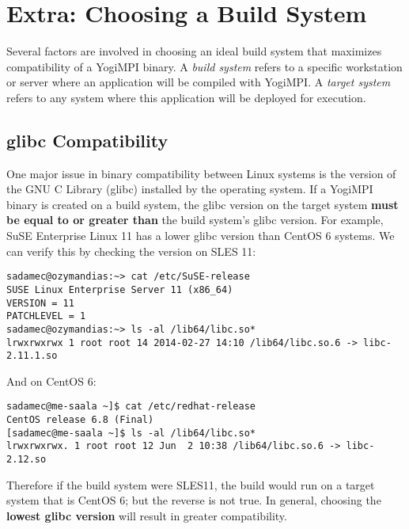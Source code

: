 \documentclass{article}
\begin{document}
\section{Extra: Choosing a Build System}
\label{choosebuild}
Several factors are involved in choosing an ideal build system that maximizes compatibility of a YogiMPI binary. A \textit{build system} refers to a specific workstation or server where an application will be compiled with YogiMPI.  A \textit{target system} refers to any system where this application will be deployed for execution.
\subsection{glibc Compatibility}
One major issue in binary compatibility between Linux systems is the version of the GNU C Library (glibc) installed by the operating system. If a YogiMPI binary is created on a build system, the glibc version on the target system \textbf{must be equal to or greater than} the build system's glibc version.
For example, SuSE Enterprise Linux 11 has a lower glibc version than CentOS 6 systems. We can verify this by checking the version on SLES 11:
\begin{verbatim}
sadamec@ozymandias:~> cat /etc/SuSE-release
SUSE Linux Enterprise Server 11 (x86_64)
VERSION = 11
PATCHLEVEL = 1
sadamec@ozymandias:~> ls -al /lib64/libc.so*
lrwxrwxrwx 1 root root 14 2014-02-27 14:10 /lib64/libc.so.6 -> libc-2.11.1.so
\end{verbatim}
And on CentOS 6:
\begin{verbatim}
sadamec@me-saala ~]$ cat /etc/redhat-release
CentOS release 6.8 (Final)
[sadamec@me-saala ~]$ ls -al /lib64/libc.so*
lrwxrwxrwx. 1 root root 12 Jun  2 10:38 /lib64/libc.so.6 -> libc-2.12.so
\end{verbatim}
Therefore if the build system were SLES11, the build would run on a target system that is CentOS 6; but the reverse is not true. In general, choosing the \textbf{lowest glibc version} will result in greater compatibility.
\end{document}
